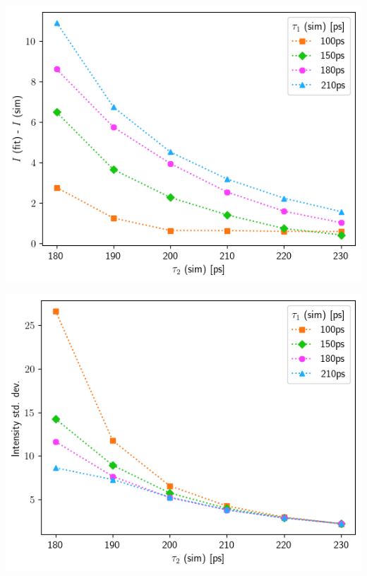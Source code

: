 {\begin{minipage}{ .47\linewidth}
    \includegraphics[width=\linewidth]{Batch 3/single Gaussian IRF/2080-diff i1.png}
    \label{fig:compirf-I-2080}
\end{minipage}
\hfill
\begin{minipage}{ .47\linewidth}
    \includegraphics[width=\linewidth]{Batch 3/single Gaussian IRF/2080-err i1.png}
    \label{fig:compirf-Ierr-2080}
\end{minipage}
\begin{minipage}{ .47\linewidth}

\end{minipage}}

